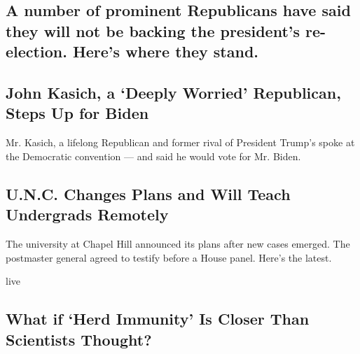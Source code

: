 \href{/article/republicans-voting-for-biden-not-trump.html}{}

\hypertarget{a-number-of-prominent-republicans-have-said-they-will-not-be-backing-the-presidents-re-election-heres-where-they-stand}{%
\subsection{A number of prominent Republicans have said they will not be
backing the president's re-election. Here's where they
stand.}\label{a-number-of-prominent-republicans-have-said-they-will-not-be-backing-the-presidents-re-election-heres-where-they-stand}}

\href{/2020/08/17/us/politics/john-kasich-biden.html}{}

\hypertarget{john-kasich-a-deeply-worried-republican-steps-up-for-biden}{%
\subsection{John Kasich, a `Deeply Worried' Republican, Steps Up for
Biden}\label{john-kasich-a-deeply-worried-republican-steps-up-for-biden}}

Mr. Kasich, a lifelong Republican and former rival of President Trump's
spoke at the Democratic convention --- and said he would vote for Mr.
Biden.

\href{/2020/08/17/world/coronavirus-covid.html}{}

\hypertarget{unc-changes-plans-and-will-teach-undergrads-remotely}{%
\subsection{U.N.C. Changes Plans and Will Teach Undergrads
Remotely}\label{unc-changes-plans-and-will-teach-undergrads-remotely}}

The university at Chapel Hill announced its plans after new cases
emerged. The postmaster general agreed to testify before a House panel.
Here's the latest.

live

\href{/2020/08/17/health/coronavirus-herd-immunity.html}{}

\hypertarget{what-if-herd-immunity-is-closer-than-scientists-thought}{%
\subsection{What if `Herd Immunity' Is Closer Than Scientists
Thought?}\label{what-if-herd-immunity-is-closer-than-scientists-thought}}

